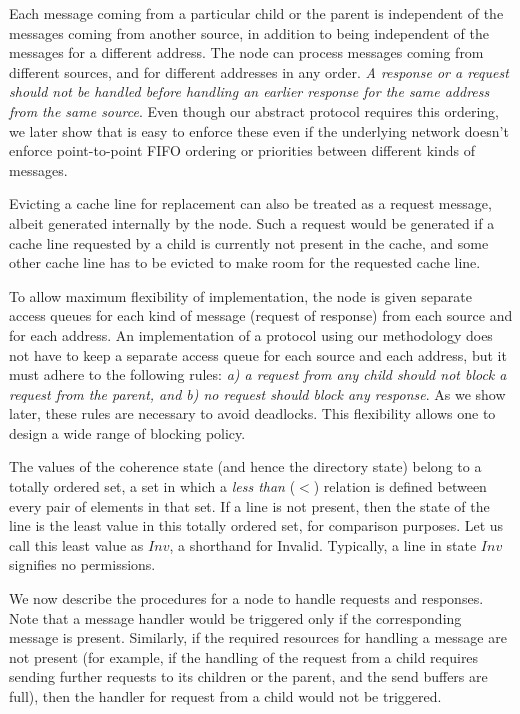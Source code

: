 Each message coming from a particular child or the parent is independent of the
messages coming from another source, in addition to being independent of the
messages for a different address. The node can process messages coming from
different sources, and for different addresses in any order. \emph{ A response
or a request should not be handled before handling an earlier response for the
same address from the same source}. Even though our abstract protocol requires
this ordering, we later show that is easy to enforce these even if the
underlying network doesn't enforce point-to-point FIFO ordering or priorities
between different kinds of messages.

Evicting a cache line for replacement can also be treated as a request message,
albeit generated internally by the node. Such a request would be generated if a
cache line requested by a child is currently not present in the cache, and some
other cache line has to be evicted to make room for the requested cache line. 

To allow maximum flexibility of implementation, the node is given separate
access queues for each kind of message (request of response) from each source
and for each address. An implementation of a protocol using our methodology does
not have to keep a separate access queue for each source and each address, but
it must adhere to the following rules: \emph{\emph{a)} a request from any child
should not block a request from the parent, and \emph{b)} no request should
block any response}. As we show later, these rules are necessary to avoid
deadlocks. This flexibility allows one to design a wide range of blocking
policy.

The values of the coherence state (and hence the directory state) belong to a
totally ordered set, \ie a set in which a \emph{less than} ($<$) relation is
defined between every pair of elements in that set. If a line is not present,
then the state of the line is the least value in this totally ordered set, for
comparison purposes. Let us call this least value as $Inv$, a shorthand for
Invalid. Typically, a line in state $Inv$ signifies no permissions.

We now describe the procedures for a node to handle requests and responses. Note
that a message handler would be triggered only if the corresponding message is
present.  Similarly, if the required resources for handling a message are not
present (for example, if the handling of the request from a child requires
sending further requests to its children or the parent, and the send buffers are
full), then the handler for request from a child would not be triggered.

